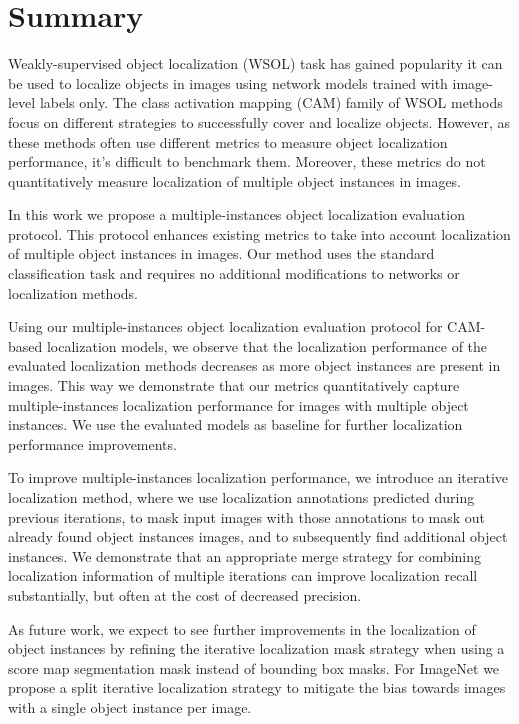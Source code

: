 \chapter*{Summary}

Weakly-supervised object localization (WSOL) task has gained popularity it can be used to localize objects in images using network models trained with image-level labels only. The class activation mapping (CAM) family of WSOL methods focus on different strategies to successfully cover and localize objects. However, as these methods often use different metrics to measure object localization performance, it's difficult to benchmark them. Moreover, these metrics do not quantitatively measure localization of multiple object instances in images.

In this work we propose a multiple-instances object localization evaluation protocol. This protocol enhances existing metrics to take into account localization of multiple object instances in images. Our method uses the standard classification task and requires no additional modifications to networks or localization methods.

Using our multiple-instances object localization evaluation protocol for CAM-based localization models, we observe that the localization performance of the evaluated localization methods decreases as more object instances are present in images. This way we demonstrate that our metrics quantitatively capture multiple-instances localization performance for images with multiple object instances. We use the evaluated models as baseline for further localization performance improvements.

To improve multiple-instances localization performance, we introduce an iterative localization method, where we use localization annotations predicted during previous iterations, to mask input images with those annotations to mask out already found object instances images, and to subsequently find additional object instances. We demonstrate that an appropriate merge strategy for combining localization information of multiple iterations can improve localization recall substantially, but often at the cost of decreased precision. 

As future work, we expect to see further improvements in the localization of object instances by refining the iterative localization mask strategy when using a score map segmentation mask instead of bounding box masks. For ImageNet we propose a split iterative localization strategy to mitigate the bias towards images with a single object instance per image.